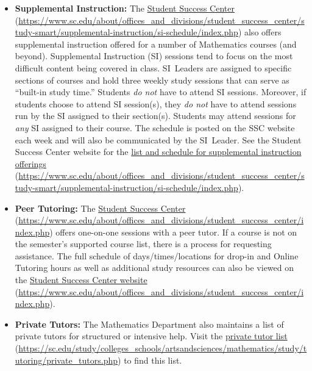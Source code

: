 \documentclass[11pt,letterpaper]{article}
\begin{document}
\begin{itemize}
	\item {\bfseries Supplemental Instruction:} The \href{https://www.sc.edu/about/offices\_and\_divisions/student\_success\_center/study-smart/supplemental-instruction/si-schedule/index.php}{Student Success Center} (\url{https://www.sc.edu/about/offices\_and\_divisions/student\_success\_center/study-smart/supplemental-instruction/si-schedule/index.php}) also offers supplemental instruction offered for a number of Mathematics courses (and beyond). Supplemental Instruction (SI) sessions tend to focus on the most difficult content being covered in class. SI~Leaders are assigned to specific sections of courses and hold three weekly study sessions that can serve as ``built-in study time.'' Students \textit{do not} have to attend SI sessions. Moreover, if students choose to attend SI session(s), they \textit{do not} have to attend sessions run by the SI assigned to their section(s). Students may attend sessions for \textit{any} SI assigned to their course. The schedule is posted on the SSC website each week and will also be communicated by the SI~Leader. See the Student Success Center website for the \href{https://www.sc.edu/about/offices\_and\_divisions/student\_success\_center/study-smart/supplemental-instruction/si-schedule/index.php}{list and schedule for supplemental instruction offerings} (\url{https://www.sc.edu/about/offices\_and\_divisions/student\_success\_center/study-smart/supplemental-instruction/si-schedule/index.php}).
		
	\item {\bfseries Peer Tutoring:} The \href{https://www.sc.edu/about/offices\_and\_divisions/student\_success\_center/index.php}{Student Success Center} (\url{https://www.sc.edu/about/offices\_and\_divisions/student\_success\_center/index.php}) offers one-on-one sessions with a peer tutor.  If a course is not on the semester's supported course list, there is a process for requesting assistance. The full schedule of days/times/locations for drop-in and Online Tutoring hours as well as additional study resources can also be viewed on the \href{https://www.sc.edu/about/offices\_and\_divisions/student\_success\_center/index.php}{Student Success Center website} (\url{https://www.sc.edu/about/offices\_and\_divisions/student\_success\_center/index.php}).
	
	\item {\bfseries Private Tutors:} The Mathematics Department also maintains a list of private tutors for structured or intensive help. Visit the \href{https://sc.edu/study/colleges\_schools/artsandsciences/mathematics/study/tutoring/private\_tutors.php}{private tutor list} (\url{https://sc.edu/study/colleges\_schools/artsandsciences/mathematics/study/tutoring/private\_tutors.php}) to find this list. 
	

\end{itemize}
\end{document}
